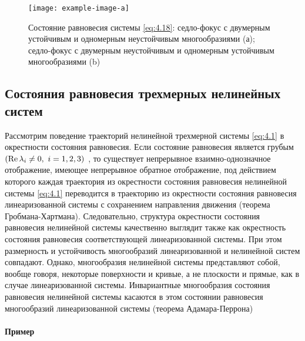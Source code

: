 \begin{figure}[h!]
        \centering
        \texttt{[image: example-image-a]}
        \caption{Состояние равновесия системы \eqref{eq:4.18}: седло-фокус с двумерным устойчивым и одномерным неустойчивым многообразиями (а); седло-фокус с двумерным неустойчивым и одномерным устойчивым многообразиями (b)}
        \label{fig:4.5}
\end{figure}


\subsection{Состояния равновесия трехмерных нелинейных систем}%
\label{sub:sostoianie_ravnovesiia_trekhmernykh_nelineinykh_sistem}

Рассмотрим поведение траекторий нелинейной трехмерной системы \eqref{eq:4.1} в
окрестности состояния равновесия. Если состояние равновесия является
грубым 
$\qty(\Re \lambda_i \neq 0,~ i=1,2,3)$ , то существует непрерывное взаимно-однозначное
отображение, имеющее непрерывное обратное отображение, под действием
которого каждая траектория из окрестности состояния равновесия нелинейной
системы \eqref{eq:4.1} переводится в траекторию из окрестности состояния равновесия
линеаризованной системы с сохранением направления движения (теорема
Гробмана-Хартмана). Следовательно, структура окрестности состояния
равновесия нелинейной системы качественно выглядит также как окрестность
состояния равновесия соответствующей линеаризованной системы. При этом
размерность и устойчивость многообразий линеаризованной и нелинейной
систем совпадают. Однако, многообразия нелинейной системы представляют
собой, вообще говоря, некоторые поверхности и кривые, а не плоскости и
прямые, как в случае линеаризованной системы. Инвариантные многообразия
состояния равновесия нелинейной системы касаются в этом состоянии
равновесия многообразий линеаризованной системы (теорема Адамара-Перрона)
\paragraph{Пример}%
\label{par:primer}

